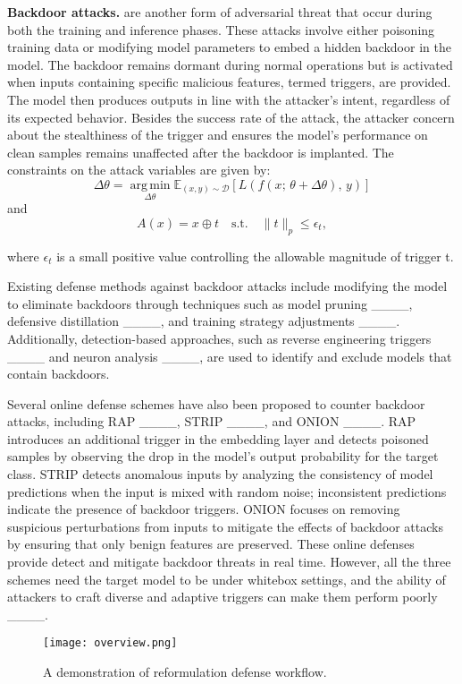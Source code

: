 \textbf{Backdoor attacks.} are another form of adversarial threat that occur during both the training and inference phases. These attacks involve either poisoning training data or modifying model parameters to embed a hidden backdoor in the model. The backdoor remains dormant during normal operations but is activated when inputs containing specific malicious features, termed triggers, are provided. The model then produces outputs in line with the attacker's intent, regardless of its expected behavior. 
Besides the success rate of the attack, the attacker concern about the stealthiness of the trigger and ensures the model's performance on clean samples remains unaffected after the backdoor is implanted. The constraints on the attack variables are given by:
\begin{equation}
\Delta\theta = \operatorname*{arg\,min}_{\Delta\theta} 
\mathbb{E}_{(x, y) \sim \mathcal{D} } 
\left[ L\left( f\left( x;\, \theta+\Delta\theta \right),\, y \right) \right]
\end{equation}
and
\begin{equation}
A(x) = x \oplus t \quad \text{s.t.} \quad \| t \|_p \leq \epsilon_t,
\end{equation}


where $\epsilon_t$ is a small positive value controlling the allowable magnitude of trigger t.

Existing defense methods against backdoor attacks include modifying the model to eliminate backdoors through techniques such as model pruning ____, defensive distillation ____, and training strategy adjustments ____. Additionally, detection-based approaches, such as reverse engineering triggers ____ and neuron analysis ____, are used to identify and exclude models that contain backdoors.

Several online defense schemes have also been proposed to counter backdoor attacks, including RAP ____, STRIP ____, and ONION ____. RAP introduces an additional trigger in the embedding layer and detects poisoned samples by observing the drop in the model's output probability for the target class. STRIP detects anomalous inputs by analyzing the consistency of model predictions when the input is mixed with random noise; inconsistent predictions indicate the presence of backdoor triggers. ONION focuses on removing suspicious perturbations from inputs to mitigate the effects of backdoor attacks by ensuring that only benign features are preserved. These online defenses provide detect and mitigate backdoor threats in real time. However, all the three schemes need the target model to be under whitebox settings, and the ability of attackers to craft diverse and adaptive triggers can make them perform poorly ____.
\begin{figure*}
    \centering
    \texttt{[image: overview.png]}
    \caption{A demonstration of reformulation defense workflow.}
    \label{fig:enter-label}
    \vspace{-1em}
\end{figure*}
